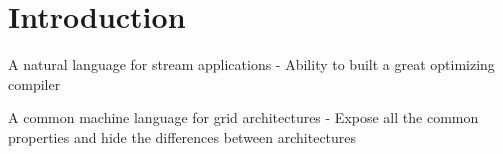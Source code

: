 \section{Introduction}


A natural language for stream applications
- Ability to built a great optimizing compiler

A common machine language for grid architectures
- Expose all the common properties and hide the differences between 
architectures

